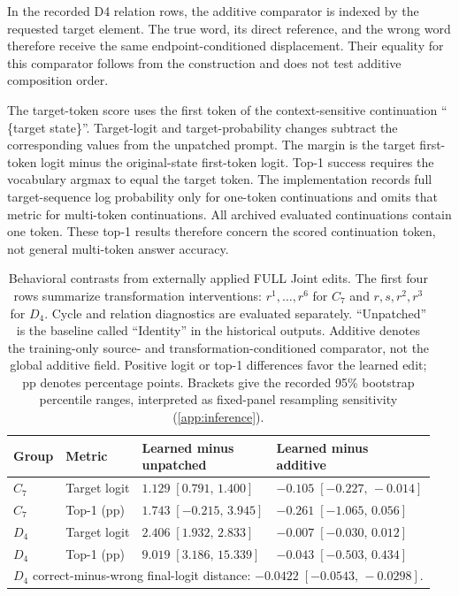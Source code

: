 In the recorded D4 relation rows, the additive
comparator is indexed by the requested target element.
The true word, its direct reference, and the wrong
word therefore receive the same endpoint-conditioned
displacement.
Their equality for this comparator follows from
the construction and does not test additive
composition order.

The target-token score uses the first token of the
context-sensitive continuation `` \{target state\}''.
Target-logit and target-probability changes subtract
the corresponding values from the unpatched prompt.
The margin is the target first-token logit minus
the original-state first-token logit.
Top-1 success requires the vocabulary argmax to
equal the target token.
The implementation records full target-sequence
log probability only for one-token continuations
and omits that metric for multi-token continuations.
All archived evaluated continuations contain one
token.
These top-1 results therefore concern the scored
continuation token, not general multi-token
answer accuracy.

\begin{table}[t]
\caption{
Behavioral contrasts from externally applied FULL
Joint edits.
The first four rows summarize transformation
interventions: $r^1,\ldots,r^6$ for $C_7$ and
$r,s,r^2,r^3$ for $D_4$.
Cycle and relation diagnostics are evaluated separately.
``Unpatched'' is the baseline called ``Identity''
in the historical outputs.
Additive denotes the training-only source- and
transformation-conditioned comparator, not the
global additive field.
Positive logit or top-1 differences favor the
learned edit; pp denotes percentage points.
Brackets give the recorded 95\% bootstrap percentile
ranges, interpreted as fixed-panel resampling
sensitivity (\cref{app:inference}).
}
\label{tab:causal-main}
\centering
\small
\begin{tabular}{llll}
\toprule
Group & Metric
& \shortstack{Learned minus\\unpatched}
& \shortstack{Learned minus\\additive} \\
\midrule
$C_7$ & Target logit
& $1.129\;[0.791,\,1.400]$
& $-0.105\;[-0.227,\,-0.014]$ \\
$C_7$ & Top-1 (pp)
& $1.743\;[-0.215,\,3.945]$
& $-0.261\;[-1.065,\,0.056]$ \\
$D_4$ & Target logit
& $2.406\;[1.932,\,2.833]$
& $-0.007\;[-0.030,\,0.012]$ \\
$D_4$ & Top-1 (pp)
& $9.019\;[3.186,\,15.339]$
& $-0.043\;[-0.503,\,0.434]$ \\
\midrule
\multicolumn{4}{l}{
$D_4$ correct-minus-wrong final-logit distance:
$-0.0422\;[-0.0543,\,-0.0298]$.
} \\
\bottomrule
\end{tabular}
\end{table}

